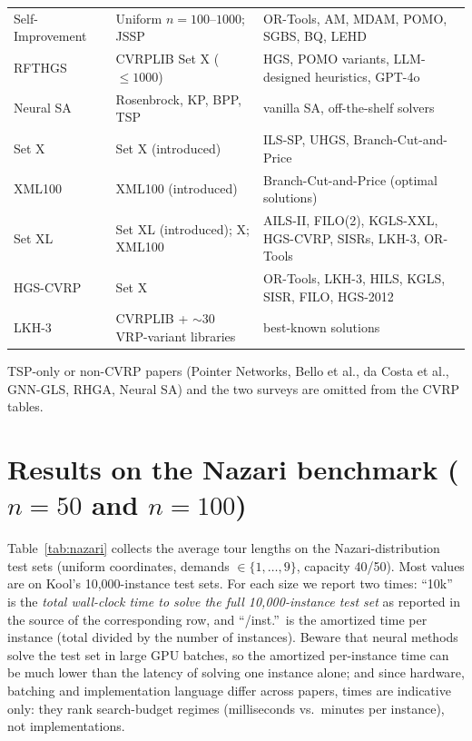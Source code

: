 \documentclass[11pt]{article}
\begin{document}
{\begin{longtable}{@{}p{3.6cm}p{5.2cm}p{6.2cm}@{}}
Self-Improvement~\citeyearpar{pirnay_self-improvement_2024} & Uniform $n{=}100$--$1000$; JSSP & OR-Tools, AM, MDAM, POMO, SGBS, BQ, LEHD \\
RFTHGS~\citeyearpar{zhu_refining_2025} & CVRPLIB Set X ($\le1000$) & HGS, POMO variants, LLM-designed heuristics, GPT-4o \\
Neural SA~\citeyearpar{correia_neural_2022} & Rosenbrock, KP, BPP, TSP & vanilla SA, off-the-shelf solvers \\
Set X~\citeyearpar{uchoa_new_2017} & Set X (introduced) & ILS-SP, UHGS, Branch-Cut-and-Price \\
XML100~\citeyearpar{queiroga_10000_nodate} & XML100 (introduced) & Branch-Cut-and-Price (optimal solutions) \\
Set XL~\citeyearpar{queiroga_xl_2026} & Set XL (introduced); X; XML100 & AILS-II, FILO(2), KGLS-XXL, HGS-CVRP, SISRs, LKH-3, OR-Tools \\
HGS-CVRP~\citeyearpar{vidal_hybrid_2022} & Set X & OR-Tools, LKH-3, HILS, KGLS, SISR, FILO, HGS-2012 \\
LKH-3~\citeyearpar{helsgaun_extension_2017} & CVRPLIB + $\sim$30 VRP-variant libraries & best-known solutions \\
\bottomrule
\end{longtable}
}

\noindent TSP-only or non-CVRP papers (Pointer Networks, Bello et al., da Costa et al.,
GNN-GLS, RHGA, Neural SA) and the two surveys are omitted from the CVRP tables.

\section{Results on the Nazari benchmark ($n=50$ and $n=100$)}
\label{sec:nazari-table}

Table~\ref{tab:nazari} collects the average tour lengths on the Nazari-distribution test
sets (uniform coordinates, demands $\in\{1,\dots,9\}$, capacity 40/50). Most values are on
Kool's 10{,}000-instance test sets. For each size we report two times: ``10k'' is the
\emph{total wall-clock time to solve the full 10{,}000-instance test set} as reported in
the source of the corresponding row, and ``/inst.''\ is the amortized time per instance
(total divided by the number of instances). Beware that neural methods solve the test set
in large GPU batches, so the amortized per-instance time can be much lower than the
latency of solving one instance alone; and since hardware, batching and implementation
language differ across papers, times are indicative only: they rank search-budget regimes
(milliseconds vs.\ minutes per instance), not implementations.
\end{document}
